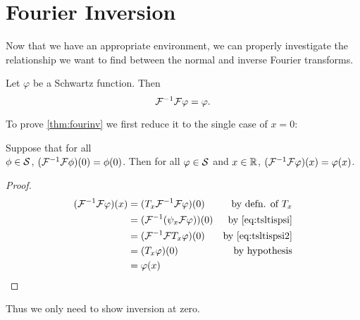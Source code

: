     \section{Fourier Inversion}
      Now that we have an appropriate environment, we can properly investigate the relationship we want to find between the normal and inverse Fourier transforms.
      \begin{thm}
        \label{thm:fourinv}
        Let $\varphi$ be a Schwartz function.
        Then \[\F^{-1}\F \varphi = \varphi\text{.}\]
      \end{thm}
      To prove \cref{thm:fourinv} we first reduce it to the single case of $x=0$:
      \begin{claim}
        Suppose that for all\\$\phi\in\S$, $(\F^{-1}\F\phi)(0) = \phi(0)$.
        Then for all $\varphi\in\S$ and $x\in\R$, $(\F^{-1}\F\varphi)(x)=\varphi(x)$.
        \begin{proof}
          \begin{align*}
            (\F^{-1}\F\varphi)(x) &= (T_x\F^{-1}\F\varphi)(0) &\text{by defn. of $T_x$}\\
            &= (\F^{-1}(\psi_x\F\varphi))(0) &\text{by \cref{eq:tsltispsi}}\\
            &= (\F^{-1}\F T_x\varphi)(0)  &\text{by \cref{eq:tsltispsi2}}\\
            &= (T_x\varphi)(0) &\text{by hypothesis}\\
            &= \varphi(x)
          \end{align*}
        \end{proof}
      \end{claim}
      Thus we only need to show inversion at zero.


